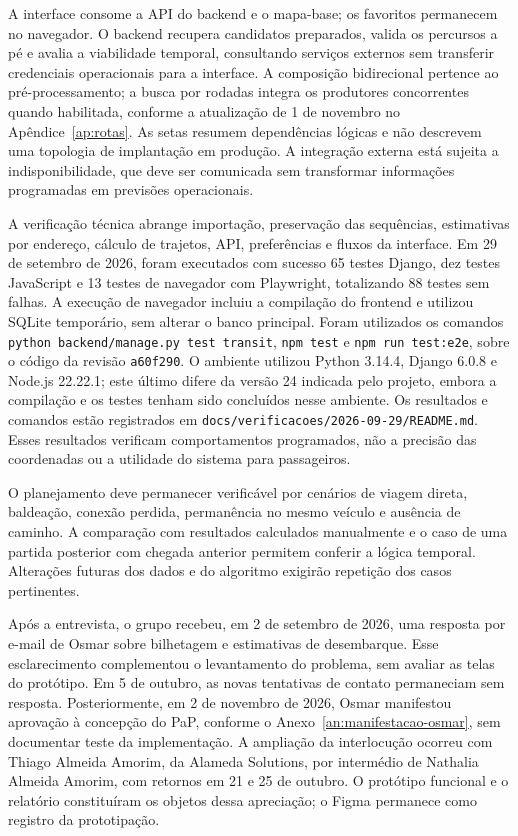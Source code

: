A interface consome a API do backend e o mapa-base; os favoritos permanecem no navegador. O backend recupera candidatos preparados, valida os percursos a pé e avalia a viabilidade temporal, consultando serviços externos sem transferir credenciais operacionais para a interface. A composição bidirecional pertence ao pré-processamento; a busca por rodadas integra os produtores concorrentes quando habilitada, conforme a atualização de 1 de novembro no Apêndice~\ref{ap:rotas}. As setas resumem dependências lógicas e não descrevem uma topologia de implantação em produção. A integração externa está sujeita a indisponibilidade, que deve ser comunicada sem transformar informações programadas em previsões operacionais.

A verificação técnica abrange importação, preservação das sequências, estimativas por endereço, cálculo de trajetos, API, preferências e fluxos da interface. Em 29 de setembro de 2026, foram executados com sucesso 65 testes Django, dez testes JavaScript e 13 testes de navegador com Playwright, totalizando 88 testes sem falhas. A execução de navegador incluiu a compilação do frontend e utilizou SQLite temporário, sem alterar o banco principal. Foram utilizados os comandos \texttt{python backend/manage.py test transit}, \texttt{npm test} e \texttt{npm run test:e2e}, sobre o código da revisão \texttt{a60f290}. O ambiente utilizou Python 3.14.4, Django 6.0.8 e Node.js 22.22.1; este último difere da versão 24 indicada pelo projeto, embora a compilação e os testes tenham sido concluídos nesse ambiente. Os resultados e comandos estão registrados em \nolinkurl{docs/verificacoes/2026-09-29/README.md}. Esses resultados verificam comportamentos programados, não a precisão das coordenadas ou a utilidade do sistema para passageiros.

O planejamento deve permanecer verificável por cenários de viagem direta, baldeação, conexão perdida, permanência no mesmo veículo e ausência de caminho. A comparação com resultados calculados manualmente e o caso de uma partida posterior com chegada anterior permitem conferir a lógica temporal. Alterações futuras dos dados e do algoritmo exigirão repetição dos casos pertinentes.

Após a entrevista, o grupo recebeu, em 2 de setembro de 2026, uma resposta por e-mail de Osmar sobre bilhetagem e estimativas de desembarque. Esse esclarecimento complementou o levantamento do problema, sem avaliar as telas do protótipo. Em 5 de outubro, as novas tentativas de contato permaneciam sem resposta. Posteriormente, em 2 de novembro de 2026, Osmar manifestou aprovação à concepção do PaP, conforme o Anexo~\ref{an:manifestacao-osmar}, sem documentar teste da implementação. A ampliação da interlocução ocorreu com Thiago Almeida Amorim, da Alameda Solutions, por intermédio de Nathalia Almeida Amorim, com retornos em 21 e 25 de outubro. O protótipo funcional e o relatório constituíram os objetos dessa apreciação; o Figma permanece como registro da prototipação.

